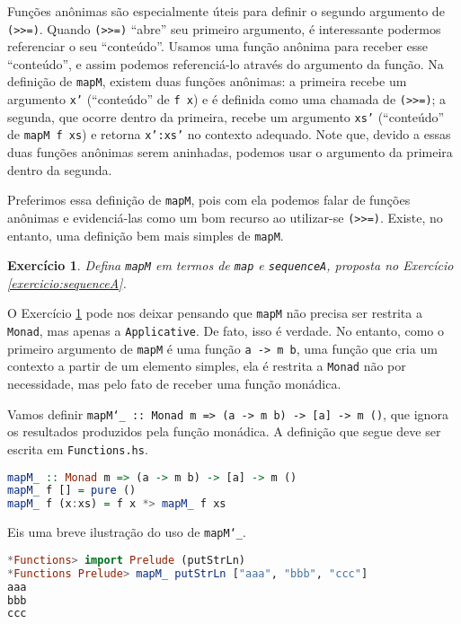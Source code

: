 \documentclass[a4paper]{article}
\newtheorem{exercicio}{Exercício}
\begin{document}
Funções anônimas são especialmente úteis para definir o segundo argumento de \texttt{(>>=)}.
Quando \texttt{(>>=)} ``abre'' seu primeiro argumento, é interessante podermos referenciar o seu ``conteúdo''.
Usamos uma função anônima para receber esse ``conteúdo'', e assim podemos referenciá-lo através do argumento da função.
Na definição de \texttt{mapM}, existem duas funções anônimas:
a primeira recebe um argumento \texttt{x'} (``conteúdo'' de \texttt{f x}) e é definida como uma chamada de \texttt{(>>=)};
a segunda, que ocorre dentro da primeira, recebe um argumento \texttt{xs'} (``conteúdo'' de \texttt{mapM f xs}) e retorna \texttt{x':xs'} no contexto adequado.
Note que, devido a essas duas funções anônimas serem aninhadas, podemos usar o argumento da primeira dentro da segunda.

Preferimos essa definição de \texttt{mapM}, pois com ela podemos falar de funções anônimas e evidenciá-las como um bom recurso ao utilizar-se \texttt{(>>=)}.
Existe, no entanto, uma definição bem mais simples de \texttt{mapM}.

\begin{exercicio} \label{exercicio:mapM}
	Defina \emph{\texttt{mapM}} em termos de \emph{\texttt{map}} e \emph{\texttt{sequenceA}}, proposta no Exercício \ref{exercicio:sequenceA}.
\end{exercicio}

O Exercício \ref{exercicio:mapM} pode nos deixar pensando que \texttt{mapM} não precisa ser restrita a \texttt{Monad}, mas apenas a \texttt{Applicative}.
De fato, isso é verdade.
No entanto, como o primeiro argumento de \texttt{mapM} é uma função \texttt{a -> m b}, uma função que cria um contexto a partir de um elemento simples, ela é restrita a \texttt{Monad} não por necessidade, mas pelo fato de receber uma função monádica.

Vamos definir \texttt{mapM\char`_ \quad:: Monad m => (a -> m b) -> [a] -> m ()}, que ignora os resultados produzidos pela função monádica.
A definição que segue deve ser escrita em \texttt{Functions.hs}.

\begin{lstlisting}[language=haskell, frame=single]
mapM_ :: Monad m => (a -> m b) -> [a] -> m ()
mapM_ f [] = pure ()
mapM_ f (x:xs) = f x *> mapM_ f xs
\end{lstlisting}

Eis uma breve ilustração do uso de \texttt{mapM\char`_}.

\begin{lstlisting}[language=haskell, frame=single]
*Functions> import Prelude (putStrLn)
*Functions Prelude> mapM_ putStrLn ["aaa", "bbb", "ccc"]
aaa
bbb
ccc
\end{lstlisting}
\end{document}
